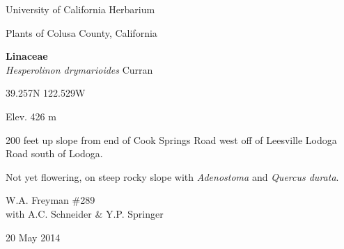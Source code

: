 \documentclass[letterpaper,10pt]{article}
\begin{document}
\begin{minipage}[t]{0.40\textwidth}

\begin{center}
University of California Herbarium \\
\begin{large}
Plants of Colusa County, California \\
\end{large}
\vspace{\baselineskip}
\textbf{Linaceae} \\
\textit{Hesperolinon drymarioides} Curran\\
\end{center}

\begin{footnotesize}

\begin{multicols}{2}
39.257\textdegree N 122.529\textdegree W
\columnbreak
\begin{flushright}
Elev. 426 m
\end{flushright}
\end{multicols}

200 feet up slope from end of Cook Springs Road west off of Leesville Lodoga Road south of Lodoga.
\vspace{\baselineskip}

Not yet flowering, on steep rocky slope with \textit{Adenostoma} and \textit{Quercus durata}.

\begin{multicols}{2}
W.A. Freyman \#289 \\
with A.C. Schneider \& Y.P. Springer
\columnbreak
\begin{flushright}
20 May 2014
\end{flushright}
\end{multicols}

\end{footnotesize}

\end{minipage}

\vspace{2cm}
%
%

%
%
\end{document}
